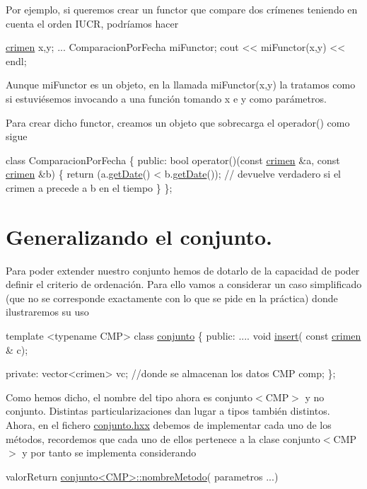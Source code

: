 Por ejemplo, si queremos crear un functor que compare dos crímenes teniendo en cuenta el orden I\-U\-C\-R, podríamos hacer


\begin{DoxyCode}
\hyperlink{classcrimen}{crimen} x,y;
...
ComparacionPorFecha miFunctor;
cout << miFunctor(x,y) << endl;
\end{DoxyCode}
 Aunque mi\-Functor es un objeto, en la llamada mi\-Functor(x,y) la tratamos como si estuviésemos invocando a una función tomando x e y como parámetros.

Para crear dicho functor, creamos un objeto que sobrecarga el operador() como sigue


\begin{DoxyCode}
\textcolor{keyword}{class }ComparacionPorFecha \{
 \textcolor{keyword}{public}:
   \textcolor{keywordtype}{bool} operator()(\textcolor{keyword}{const} \hyperlink{classcrimen}{crimen} &a, \textcolor{keyword}{const} \hyperlink{classcrimen}{crimen} &b) \{
     \textcolor{keywordflow}{return} (a.\hyperlink{classcrimen_a8a6712e536211034819441ab87e1c215}{getDate}() < b.\hyperlink{classcrimen_a8a6712e536211034819441ab87e1c215}{getDate}()); \textcolor{comment}{// devuelve verdadero si el crimen a precede a b en
       el tiempo}
 \}
\};
\end{DoxyCode}
\hypertarget{index_generalizar}{}\section{Generalizando el conjunto.}\label{index_generalizar}
Para poder extender nuestro conjunto hemos de dotarlo de la capacidad de poder definir el criterio de ordenación. Para ello vamos a considerar un caso simplificado (que no se corresponde exactamente con lo que se pide en la práctica) donde ilustraremos su uso


\begin{DoxyCode}
\textcolor{keyword}{template} <\textcolor{keyword}{typename} CMP>
\textcolor{keyword}{class }\hyperlink{classconjunto}{conjunto} \{
  \textcolor{keyword}{public}:
    ....
    \textcolor{keywordtype}{void} \hyperlink{classconjunto_a61c22092268cc91439b93a2fd96e4173}{insert}( \textcolor{keyword}{const} \hyperlink{classcrimen}{crimen} & c);

  \textcolor{keyword}{private}:
    vector<crimen> vc; \textcolor{comment}{//donde se almacenan los datos}
    CMP comp;
\};
\end{DoxyCode}
 Como hemos dicho, el nombre del tipo ahora es conjunto$<$\-C\-M\-P$>$ y no conjunto. Distintas particularizaciones dan lugar a tipos también distintos. Ahora, en el fichero \hyperlink{conjunto_8hxx_source}{conjunto.\-hxx} debemos de implementar cada uno de los métodos, recordemos que cada uno de ellos pertenece a la clase conjunto$<$\-C\-M\-P$>$ y por tanto se implementa considerando 
\begin{DoxyCode}
valorReturn \hyperlink{classconjunto}{conjunto<CMP>::nombreMetodo}( parametros ...)
\end{DoxyCode}


